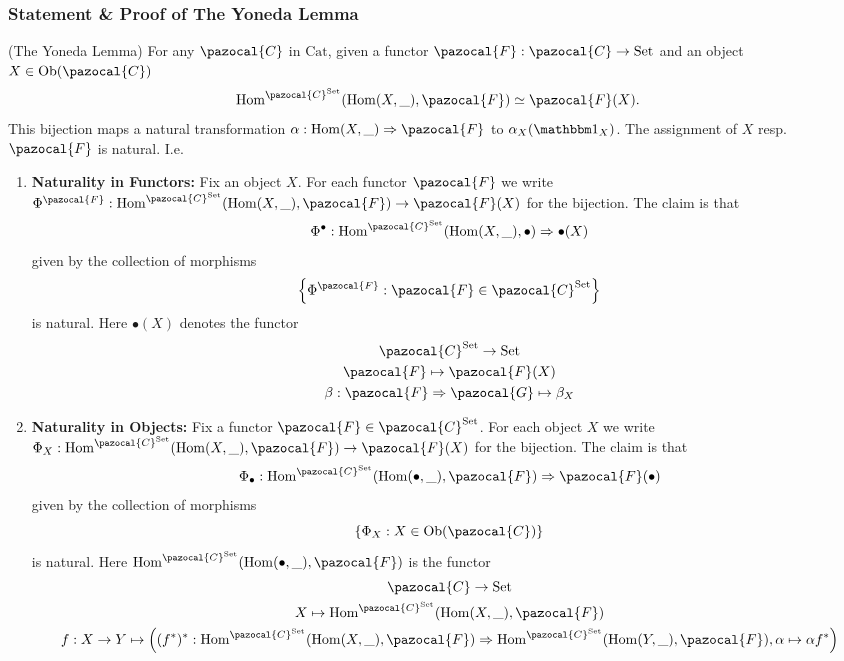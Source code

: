 \subsubsection{Statement \& Proof of The Yoneda Lemma}
\begin{theorem}(The Yoneda Lemma) For any $\pazocal{C}$ in $\mathrm{Cat}$, given a functor $\pazocal{F}:\pazocal{C}\rightarrow \mathrm{Set}$ and an object $X\in \Ob(\pazocal{C})$
$$
    \Hom^{\pazocal{C}^\mathrm{Set}}(\Hom(X,\_),\pazocal{F}) \simeq \pazocal{F}(X).
$$
This bijection maps a natural transformation $\alpha: \Hom(X,\_) \Rightarrow \pazocal{F}$ to $\alpha_X(\fone_X)$. The assignment of $X$ resp. $\pazocal{F}$ is natural. I.e.
\begin{enumerate}
    \item \textbf{Naturality in Functors:} Fix an object $X$. For each functor $\pazocal{F}$ we write $\Phi^{\pazocal{F}} : \Hom^{\pazocal{C}^{\mathrm{Set}}}(\Hom(X,\_),\pazocal{F}) \rightarrow \pazocal{F}(X)$ for the bijection. The claim is that 
    $$\Phi^{\bullet}  : \Hom^{\pazocal{C}^\mathrm{Set}}(\Hom(X,\_),\bullet) \Rightarrow \bullet(X)$$
    given by the collection of morphisms
    $$\left\{\Phi^\pazocal{F} : \pazocal{F} \in \pazocal{C}^\mathrm{Set}\right\}$$
    is natural. Here $\bullet(X)$ denotes the functor 
    \begin{gather*}
        \pazocal{C}^\mathrm{Set} \rightarrow \mathrm{Set}\\
        \pazocal{F} \mapsto \pazocal{F}(X)\\
        \beta : \pazocal{F}\Rightarrow \pazocal{G} \mapsto \beta_X
    \end{gather*}
    \item \textbf{Naturality in Objects:} Fix a functor $\pazocal{F}\in \pazocal{C}^\mathrm{Set}$. For each object $X$ we write $\Phi_X : \Hom^{\pazocal{C}^\mathrm{Set}}(\Hom(X,\_),\pazocal{F}) \rightarrow \pazocal{F}(X)$ for the bijection. The claim is that 
    $$\Phi_\bullet : \Hom^{\pazocal{C}^\mathrm{Set}}(\Hom(\bullet,\_),\pazocal{F})\Rightarrow \pazocal{F}(\bullet)$$
    given by the collection of morphisms
    $$\left\{ \Phi_X : X\in \Ob(\pazocal{C})\right\}$$
    is natural. Here $\Hom^{\pazocal{C}^\mathrm{Set}}(\Hom(\bullet,\_),\pazocal{F})$ is the functor 
    \begin{gather*}
        \pazocal{C}\rightarrow \mathrm{Set}\\
        X \mapsto \Hom^{\pazocal{C}^\mathrm{Set}}(\Hom(X,\_),\pazocal{F})\\
        f : X\rightarrow Y \mapsto \left((f^\ast)^\ast: \Hom^{\pazocal{C}^\mathrm{Set}}(\Hom(X,\_),\pazocal{F}) \Rightarrow \Hom^{\pazocal{C}^\mathrm{Set}}(\Hom(Y,\_),\pazocal{F}),\alpha \mapsto \alpha f^\ast\right)
    \end{gather*}

\end{enumerate}
\end{theorem}
